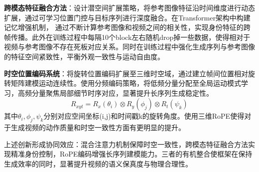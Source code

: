 \textbf{跨模态特征融合方法}：设计潜空间扩展策略，将参考图像特征沿时间维度进行动态扩展，通过可学习位置门控与目标序列进行深度融合。在Transformer架构中构建记忆增强机制， 通过不断计算参考图像和视频之间的相关性，实现身份特征的跨帧传播。此外在训练过程中每隔10个block左右随机drop掉一些数据，使得相对于视频与参考图像不存在死板对应关系。同时在训练过程中强化生成序列与参考图像的特征空间紧致性，平衡外观一致性与运动自由度。

\textbf{时空位置编码系统}：将旋转位置编码扩展至三维时空域，通过建立帧间位置相对旋转矩阵建模运动连续性。使用分频编码策略，将低频分量分配至全局运动模式学习，高频分量聚焦局部细节时序对应，显著提升长序列生成稳定性。
\begin{equation}
R_{xyt} = R_x(\theta_i) \otimes R_y(\phi_j) \otimes R_t(\psi_k)
\end{equation}
其中$\theta_i,\phi_j,\psi_k$分别对应空间坐标(i,j)和时间戳k的旋转角度。使用三维RoPE使得对于生成视频的动作质量和时空一致性方面有更明显的提升。

上述创新形成协同效应：混合注意力机制保障时空一致性，跨模态特征融合方法实现精准身份控制，RoPE编码增强长序列建模能力。三者的有机整合使框架在保持生成效率的同时，显著提升视频的语义保真度与物理合理性。

